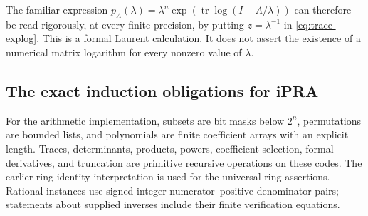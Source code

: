The familiar expression
$p_A(\lambda)=\lambda^n\exp(\operatorname{tr}\log(I-A/\lambda))$
can therefore be read rigorously, at every finite precision, by putting
$z=\lambda^{-1}$ in \eqref{eq:trace-explog}.  This is a formal Laurent
calculation.  It does not assert the existence of a numerical matrix
logarithm for every nonzero value of $\lambda$.

\subsection{The exact induction obligations for iPRA}

For the arithmetic implementation, subsets are bit masks below $2^n$,
permutations are bounded lists, and polynomials are finite coefficient
arrays with an explicit length.  Traces, determinants, products, powers,
coefficient selection, formal derivatives, and truncation are primitive
recursive operations on these codes.  The earlier ring-identity
interpretation is used for the universal ring assertions.  Rational
instances use signed integer numerator--positive denominator pairs;
statements about supplied inverses include their finite verification
equations.

